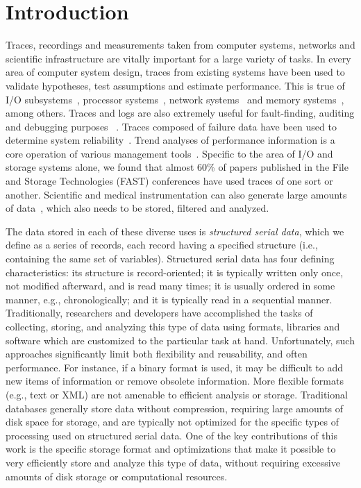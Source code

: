 \documentclass{acm_proc_article-sp}
\begin{document}


\section{Introduction}

Traces, recordings and measurements taken from computer systems,
networks and scientific infrastructure are vitally important for a
large variety of tasks. In every area of computer system design,
traces from existing systems have been used to validate hypotheses,
test assumptions and estimate performance. This is true of I/O
subsystems~\cite{IORef,Ji03,Uysal03}, processor
systems~\cite{ProcRef}, network systems~\cite{NetRef} and memory
systems~\cite{MemRef}, among others. Traces and logs are also
extremely useful for fault-finding, auditing and debugging purposes
~\cite{DebugRef}. Traces composed of failure data have been used to
determine system reliability~\cite{ReliabilityRef, Schroeder07,
Pinheiro07}. Trend analyses of performance information is a core
operation of various management tools~\cite{MgmtRef}. Specific to the
area of I/O and storage systems alone, we found that almost 60\% of
papers published in the File and Storage Technologies (FAST)
conferences have used traces of one sort or another.  Scientific and
medical instrumentation can also generate large amounts of
data~\cite{SciRef}, which also needs to be stored, filtered and
analyzed.

The data stored in each of these diverse uses is {\it structured
serial data}, which we define as a series of records, each record
having a specified structure (i.e., containing the same set of
variables). Structured serial data has four defining characteristics:
its structure is record-oriented; it is typically written only once,
not modified afterward, and is read many times; it is usually ordered
in some manner, e.g., chronologically; and it is typically read in a
sequential manner.  Traditionally, researchers and developers have
accomplished the tasks of collecting, storing, and analyzing this type
of data using formats, libraries and software which are customized to
the particular task at hand.  Unfortunately, such approaches
significantly limit both flexibility and reusability, and often
performance.  For instance, if a binary format is used, it may be
difficult to add new items of information or remove obsolete
information.  More flexible formats (e.g., text or XML) are not
amenable to efficient analysis or storage.  Traditional databases
generally store data without compression, requiring large amounts of
disk space for storage, and are typically not optimized for the
specific types of processing used on structured serial data.  One of
the key contributions of this work is the specific storage format and
optimizations that make it possible to very efficiently store and
analyze this type of data, without requiring excessive amounts of disk
storage or computational resources.
\end{document}
